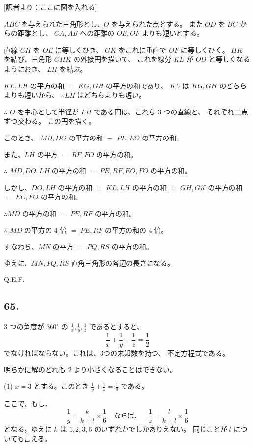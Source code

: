 [訳者より：ここに図を入れる] 

$ABC$ を与えられた三角形とし、$O$ を与えられた点とする。
また $OD$ を $BC$ からの距離とし、
$CA, AB$ への距離の $OE, OF$ よりも短いとする。

直線 $GH$ を $OE$ に等しくひき、
$GK$ をこれに垂直で $OF$ に等しくひく。
$HK$ を結び、三角形 $GHK$ の外接円を描いて、
これを線分 $KL$ が $OD$ と等しくなるようにおき、
$LH$ を結ぶ。

$KL, LH$ の平方の和 $=$ $KG, GH$ の平方の和であり、
$KL$ は $KG, GH$ のどちらよりも短いから、
$\therefore LH$ はどちらよりも短い。

$\therefore$
$O$ を中心として半径が $LH$ である円は、これら $3$ つの直線と、
それぞれ二点ずつ交わる。
この円を描く。

このとき、
$MD, DO$ の平方の和 $=$ $PE, EO$ の平方の和。

また、$LH$ の平方 $=$ $RF, FO$ の平方の和。

$\therefore$ $MD, DO, LH$ の平方の和
$=$ $PE, RF, EO, FO$ の平方の和。

しかし、$DO, LH$ の平方の和 $=$ $KL, LH$ の平方の和
$=$ $GH, GK$ の平方の和 $=$ $EO, FO$ の平方の和。

$\therefore MD$ の平方の和
$=$ $PE, RF$ の平方の和。

$\therefore$
$MD$ の平方の $4$ 倍 $=$ $PE, RF$ の平方の和の $4$ 倍。

すなわち、$MN$ の平方 $=$ $PQ, RS$ の平方の和。

ゆえに、$MN, PQ, RS$ 直角三角形の各辺の長さになる。

Q.E.F.

\subsection*{65.}

 3 つの角度が $360^\circ$ の $\frac{1}{x},\frac{1}{y},\frac{1}{z}$
であるとすると、
\[
\frac{1}{x} + \frac{1}{y} + \frac{1}{z} = \frac{1}{2}
\]
でなければならない。これは、3つの未知数を持つ、
不定方程式である。

明らかに解のどれも $2$ より小さくなることはできない。

(1) $x = 3$ とする。このとき $\frac{1}{y} + \frac{1}{z} = \frac{1}{6}$
である。

ここで、もし、
\[
\frac{1}{y} = \frac{k}{k+l} \times \frac{1}{6}
\quad \mbox{ならば、}
\quad
\frac{1}{z} = \frac{l}{k+l} \times \frac{1}{6}
\]
となる。ゆえに $k$ は $1, 2, 3, 6$ のいずれかでしかありえない。
同じことが $l$ についても言える。

